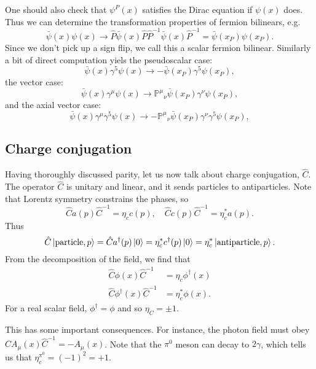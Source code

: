 One should also check that $\psi^P(x)$ satisfies the Dirac equation if $\psi(x)$ does. Thus we can determine the transformation properties of fermion bilinears, e.g.
\begin{equation}
    \bar \psi(x) \psi(x) \to \hat P \bar \psi(x) \hat P \hat P^{-1} \bar \psi(x) \hat P^{-1}= \bar \psi(x_P)\psi (x_P).
\end{equation}
Since we don't pick up a sign flip, we call this a scalar fermion bilinear.
Similarly a bit of direct computation yiels the pseudoscalar case:
\begin{equation}
    \bar \psi(x) \gamma^5 \psi(x) \to -\bar \psi (x_P)\gamma^5 \psi(x_P),
\end{equation}
the vector case:
\begin{equation}
    \bar \psi(x) \gamma^\mu \psi(x) \to \mathbb{P}^\mu{}_\nu \bar \psi (x_P)\gamma^\nu \psi(x_P),
\end{equation}
and the axial vector case:
\begin{equation}
    \bar \psi(x) \gamma^\mu \gamma^5 \psi(x) \to -\mathbb{P}^\mu{}_\nu \bar \psi (x_P)\gamma^\nu \gamma^5 \psi(x_P),
\end{equation}

\subsection*{Charge conjugation}
Having thoroughly discussed parity, let us now talk about charge conjugation, $\hat C$. The operator $\hat C$ is unitary and linear, and it sends particles to antiparticles. Note that Lorentz symmetry constrains the phases, so
\begin{equation}
    \hat C a(p) \hat C^{-1} = \eta_c c(p), \quad \hat C c(p) \hat C^{-1} = \eta_c^* a(p).
\end{equation}
Thus
\begin{equation}
    \hat C \left| \text{particle},p \right>=\hat C a^\dagger (p) \left| 0 \right> = \eta_c^* c^\dagger(p) \left| 0 \right> = \eta_c^* \left| \text{antiparticle},p \right>.
\end{equation}
From the decomposition of the field, we find that
\begin{align*}
    \hat C \phi(x) \hat C^{-1} &= \eta_c \phi^\dagger (x)\\
    \hat C \phi^\dagger(x) \hat C^{-1} &= \eta_c^*\phi (x).
\end{align*}
For a real scalar field, $\phi^\dagger =\phi$ and so $\eta_C=\pm 1$.

This has some important consequences. For instance, the photon field must obey $\hat C A_\mu(x) \hat C^{-1}=-A_\mu(x)$. Note that the $\pi^0$ meson can decay to $2\gamma$, which tells us that $\eta_c^{\pi^0} = (-1)^2 = +1$.